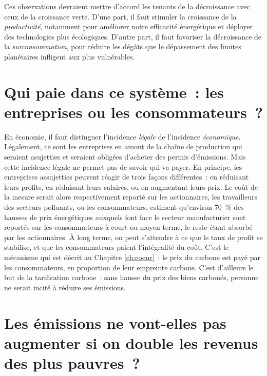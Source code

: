 \documentclass[a5paper,french]{memoir}
\begin{document}
Ces observations devraient mettre d'accord les tenants de la décroissance avec ceux de la croissance verte. D'une part, il faut stimuler la croissance de la \textit{productivité}, notamment pour améliorer notre efficacité énergétique et déployer des technologies plus écologiques. D'autre part, il faut favoriser la décroissance de la \textit{surconsommation}, pour réduire les dégâts que le dépassement des limites planétaires infligent aux plus vulnérables. 

\section*{\normalsize Qui paie dans ce système~: les entreprises ou les consommateurs~?}\label{q:incidence}

En économie, il faut distinguer l'incidence \textit{légale} de l'incidence \textit{économique}. Légalement, ce sont les entreprises en amont de la chaîne de production qui seraient asujetties et seraient obligées d'acheter des permis d'émissions. Mais cette incidence légale ne permet pas de savoir qui va payer. En principe, les entreprises assujetties peuvent réagir de trois façons différentes~: en réduisant leurs profits, en réduisant leurs salaires, ou en augmentant leurs prix. Le coût de la mesure serait alors respectivement reporté sur les actionnaires, les travailleurs des secteurs polluants, ou les consommateurs. \cite{ganapati_energy_2020} estiment qu'environ 70~\% des hausses de prix énergétiques auxquels font face le secteur manufacturier sont reportés sur les consommateurs à court ou moyen terme, le reste étant absorbé par les actionnaires. À long terme, on peut s'attendre à ce que le taux de profit se stabilise, et que les consommateurs paient l'intégralité du coût. C'est le mécanisme qui est décrit au Chapitre \ref{ch:coeur}~: le prix du carbone est payé par les consommateurs, en proportion de leur empreinte carbone. C'est d'ailleurs le but de la tarification carbone~: sans hausse du prix des biens carbonés, personne ne serait incité à réduire ses émissions.

\section*{\normalsize Les émissions ne vont-elles pas augmenter si on double les revenus des plus pauvres~?}\label{q:emissions}
\end{document}
